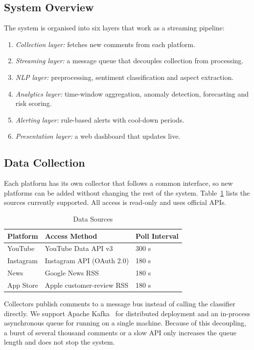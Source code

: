 \documentclass[conference]{IEEEtran}
\begin{document}
\subsection{System Overview}
The system is organised into six layers that work as a streaming pipeline:
\begin{enumerate}
\item \textit{Collection layer:} fetches new comments from each platform.
\item \textit{Streaming layer:} a message queue that decouples collection from processing.
\item \textit{NLP layer:} preprocessing, sentiment classification and aspect extraction.
\item \textit{Analytics layer:} time-window aggregation, anomaly detection, forecasting and risk
scoring.
\item \textit{Alerting layer:} rule-based alerts with cool-down periods.
\item \textit{Presentation layer:} a web dashboard that updates live.
\end{enumerate}

\subsection{Data Collection}
Each platform has its own collector that follows a common interface, so new platforms can be added
without changing the rest of the system. Table~\ref{tab:sources} lists the sources currently
supported. All access is read-only and uses official APIs.

\begin{table}[t]
\caption{Data Sources}
\label{tab:sources}
\centering
\footnotesize
\begin{tabular}{l l l}
\toprule
\textbf{Platform} & \textbf{Access Method} & \textbf{Poll Interval} \\
\midrule
YouTube & YouTube Data API v3 & 300 s \\
Instagram & Instagram API (OAuth 2.0) & 180 s \\
News & Google News RSS & 180 s \\
App Store & Apple customer-review RSS & 180 s \\
\bottomrule
\end{tabular}
\end{table}

Collectors publish comments to a message bus instead of calling the classifier directly. We support
Apache Kafka~\cite{b9} for distributed deployment and an in-process asynchronous queue for running
on a single machine. Because of this decoupling, a burst of several thousand comments or a slow API
only increases the queue length and does not stop the system.
\end{document}
